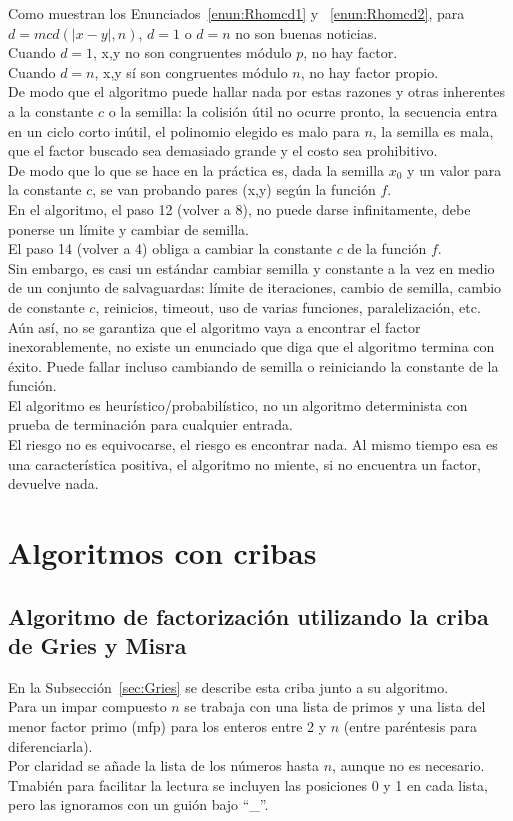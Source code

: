 Como muestran los Enunciados~\ref{enun:Rhomcd1} y ~\ref{enun:Rhomcd2}, para $d=mcd(|x-y|,n)$, $d=1$ o $d=n$ no son buenas noticias. \\
Cuando $d=1$, x,y no son congruentes módulo $p$, no hay factor. \\
Cuando $d=n$, x,y sí son congruentes módulo $n$, no hay factor propio. \\
De modo que el algoritmo puede hallar nada por estas razones y otras inherentes a la constante $c$ o la semilla: la colisión útil no ocurre pronto, la secuencia entra en un ciclo corto inútil, el polinomio elegido es malo para $n$, la semilla es mala, que el factor buscado sea demasiado grande y el costo sea prohibitivo. \\
De modo que lo que se hace en la práctica es, dada la semilla $x_0$ y un valor para la constante $c$, se van probando pares (x,y) según la función $f$. \\
En el algoritmo, el paso 12 (volver a 8), no puede darse infinitamente, debe ponerse un límite y cambiar de semilla. \\
El paso 14 (volver a 4) obliga a cambiar la constante $c$ de la función $f$. \\
Sin embargo, es casi un estándar cambiar semilla y constante a la vez en medio de un conjunto de salvaguardas: límite de iteraciones, cambio de semilla, cambio de constante $c$, reinicios, timeout, uso de varias funciones, paralelización, etc. \\

Aún así, no se garantiza que el algoritmo vaya a encontrar el factor inexorablemente, no existe un enunciado que diga que el algoritmo termina con éxito. Puede fallar incluso cambiando de semilla o reiniciando la constante de la función. \\
El algoritmo es heurístico/probabilístico, no un algoritmo determinista con prueba de terminación para cualquier entrada. \\
El riesgo no es equivocarse, el riesgo es encontrar nada.
Al mismo tiempo esa es una característica positiva, el algoritmo no miente, si no encuentra un factor, devuelve nada.

\section{Algoritmos con cribas}
\subsection{Algoritmo de factorización utilizando la criba de Gries y Misra}
En la Subsección~\ref{sec:Gries} se describe esta criba junto a su algoritmo. \\
Para un impar compuesto $n$ se trabaja con una lista de primos y una lista del menor factor primo (mfp) para los enteros entre 2 y $n$ (entre paréntesis para diferenciarla). \\
Por claridad se añade la lista de los números hasta $n$, aunque no es necesario. \\ 
Tmabién para facilitar la lectura se incluyen las posiciones 0 y 1 en cada lista, pero las ignoramos con un guión bajo “\_”.

